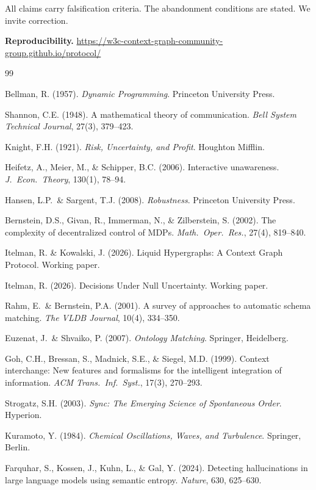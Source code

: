 \documentclass[11pt,a4paper]{article}
\begin{document}
All claims carry falsification criteria. The abandonment conditions 
are stated. We invite correction.

\bigskip
\noindent\textbf{Reproducibility.} 
\url{https://w3c-context-graph-community-group.github.io/protocol/}


\begin{thebibliography}{99}

Bellman, R. (1957). \emph{Dynamic Programming}. Princeton University Press.

Shannon, C.E. (1948). A mathematical theory of communication. 
\emph{Bell System Technical Journal}, 27(3), 379--423.

Knight, F.H. (1921). \emph{Risk, Uncertainty, and Profit}. 
Houghton Mifflin.

Heifetz, A., Meier, M., \& Schipper, B.C. (2006). Interactive 
unawareness. \emph{J.\ Econ.\ Theory}, 130(1), 78--94.

Hansen, L.P.\ \& Sargent, T.J. (2008). \emph{Robustness}. 
Princeton University Press.

Bernstein, D.S., Givan, R., Immerman, N., \& Zilberstein, S. (2002). 
The complexity of decentralized control of MDPs. \emph{Math.\ Oper.\ 
Res.}, 27(4), 819--840.

Itelman, R. \& Kowalski, J. (2026). Liquid Hypergraphs: A Context 
Graph Protocol. Working paper.

Itelman, R. (2026). Decisions Under Null Uncertainty. Working paper.

Rahm, E.\ \& Bernstein, P.A. (2001). A survey of approaches to 
automatic schema matching. \emph{The VLDB Journal}, 10(4), 334--350.

Euzenat, J.\ \& Shvaiko, P. (2007). \emph{Ontology Matching}. 
Springer, Heidelberg.

Goh, C.H., Bressan, S., Madnick, S.E., \& Siegel, M.D. (1999). 
Context interchange: New features and formalisms for the intelligent 
integration of information. \emph{ACM Trans.\ Inf.\ Syst.}, 17(3), 
270--293.

Strogatz, S.H. (2003). \emph{Sync: The Emerging Science of 
Spontaneous Order}. Hyperion.

Kuramoto, Y. (1984). \emph{Chemical Oscillations, Waves, and 
Turbulence}. Springer, Berlin.

Farquhar, S., Kossen, J., Kuhn, L., \& Gal, Y. (2024). Detecting 
hallucinations in large language models using semantic entropy. 
\emph{Nature}, 630, 625--630.

\end{thebibliography}
\end{document}
